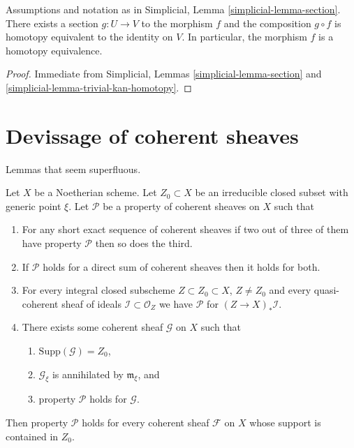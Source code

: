 \begin{lemma}
\label{lemma-equiv}
Assumptions and notation as in
Simplicial, Lemma \ref{simplicial-lemma-section}.
There exists a section $g : U \to V$ to the morphism $f$ and
the composition $g \circ f$ is homotopy equivalent to the identity
on $V$. In particular, the morphism $f$ is a homotopy equivalence.
\end{lemma}

\begin{proof}
Immediate from Simplicial, Lemmas \ref{simplicial-lemma-section} and
\ref{simplicial-lemma-trivial-kan-homotopy}.
\end{proof}



\section{Devissage of coherent sheaves}
\label{section-devissage}

\noindent
Lemmas that seem superfluous.

\begin{lemma}
\label{lemma-property-irreducible-higher-rank}
Let $X$ be a Noetherian scheme.
Let $Z_0 \subset X$ be an irreducible closed subset with generic point $\xi$.
Let $\mathcal{P}$ be a property of coherent sheaves on $X$ such that
\begin{enumerate}
\item For any short exact sequence of coherent sheaves if two
out of three of them have property $\mathcal{P}$ then so does the
third.
\item If $\mathcal{P}$ holds for a direct sum of coherent sheaves
then it holds for both.
\item For every integral closed subscheme $Z \subset Z_0 \subset X$,
$Z \not = Z_0$ and every quasi-coherent sheaf of ideals
$\mathcal{I} \subset \mathcal{O}_Z$ we have
$\mathcal{P}$ for $(Z \to X)_*\mathcal{I}$.
\item There exists some coherent sheaf $\mathcal{G}$ on $X$ such that
\begin{enumerate}
\item $\text{Supp}(\mathcal{G}) = Z_0$,
\item $\mathcal{G}_\xi$ is annihilated by $\mathfrak m_\xi$, and
\item property $\mathcal{P}$ holds for $\mathcal{G}$.
\end{enumerate}
\end{enumerate}
Then property $\mathcal{P}$ holds for every coherent sheaf
$\mathcal{F}$ on $X$ whose support is contained in $Z_0$.
\end{lemma}

